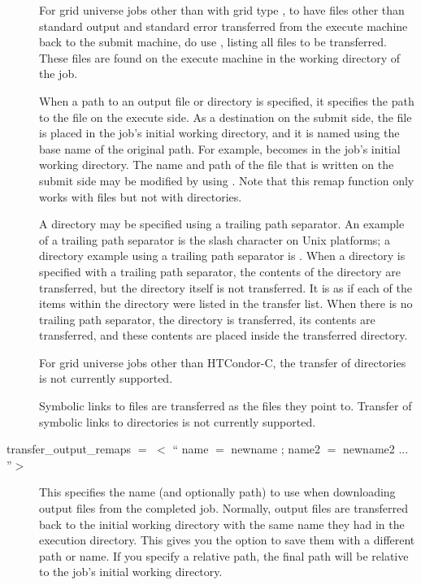 \begin{description}
For grid universe jobs other than with grid type ,
to have files other than standard output and standard error transferred
from the execute machine back to the submit machine,
do use , listing
all files to be transferred.
These files are found on the execute machine in the
working directory of the job.

When a path to an output file or directory is specified,
it specifies the path to the file on the execute side.
As a destination on the submit side,
the file is placed in the job's initial working directory,
and it is named using the base name of the original path.
For example,  becomes  in
the job's initial working directory.
The name and path of the file
that is written on the submit side may be modified by
using . Note that this remap
function only works with files but not with directories. 

A directory may be specified using a trailing path separator.
An example of a trailing path separator is the slash character on Unix
platforms; a directory example using a trailing path separator
is . 
When a directory is specified with a trailing path separator,
the contents of the directory are
transferred,  but the directory itself is not transferred.
It is as if each of the items
within the directory were listed in the transfer list.
When there is no trailing path separator,
the directory is transferred, its contents are transferred,
and these contents are placed inside the transferred directory.

For grid universe jobs other than HTCondor-C, the transfer of
directories is not currently supported.

Symbolic links to files are transferred as the files they point to.
Transfer of symbolic links to directories is not currently supported.


\label{man-condor-submit-transfer-output-remaps}
\item[transfer\_output\_remaps $=$ $<$ `` name $=$ newname ; name2 $=$ newname2 ... ''$>$ ]
This specifies the name (and optionally path) to use when downloading output
files from the completed job.  Normally, output files are transferred back
to the initial working directory with the same name they had in the execution
directory.  This gives you the option to save them with a different path
or name.  If you specify a relative path, the final path will be relative
to the job's initial working directory.


\end{description}
